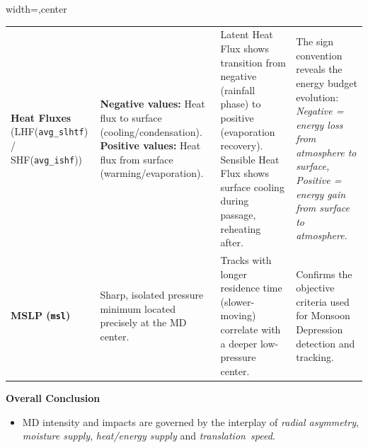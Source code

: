 \documentclass[aspectratio=169,t,xcolor=table]{beamer}
\begin{document}
\begin{frame}
\begin{adjustbox}{width=\textwidth,center}
\begin{tabular}{p{2.3cm} p{4.2cm} p{4.8cm} p{4.8cm}}
			\rowcolor{MyBlue!20}
			\textbf{Heat Fluxes} (LHF(\texttt{avg\_slhtf}) / SHF(\texttt{avg\_ishf}))                                                                                                      &
			\textbf{Negative values:} Heat flux to surface (cooling/condensation).
			\textbf{Positive values:} Heat flux from surface (warming/evaporation).                                                                                                        &
			Latent Heat Flux shows transition from negative (rainfall phase) to positive (evaporation recovery). Sensible Heat Flux shows surface cooling during passage, reheating after. &
			The sign convention reveals the energy budget evolution: \textit{Negative = energy loss from atmosphere to surface, Positive = energy gain from surface to atmosphere}.                                                                                                                                                                                                                                                                                                      \\
			\textbf{MSLP (\texttt{msl})}                                                                                                                                                   & Sharp, isolated pressure minimum located precisely at the MD center.                              & Tracks with longer residence time (slower-moving) correlate with a deeper low-pressure center. & Confirms the objective criteria used for Monsoon Depression detection and tracking.    \\
			\bottomrule
		\end{tabular}
	\end{adjustbox}

	\vspace{0.1cm}
	\begin{block}{\small \textbf{Overall Conclusion}}
		\footnotesize
		\begin{itemize}
			\item MD intensity and impacts are governed by the interplay of \textit{radial asymmetry}, \textit{moisture supply}, \textit{heat/energy supply} and \textit{translation~speed}.
		\end{itemize}
	\end{block}
\end{frame}
\end{document}
